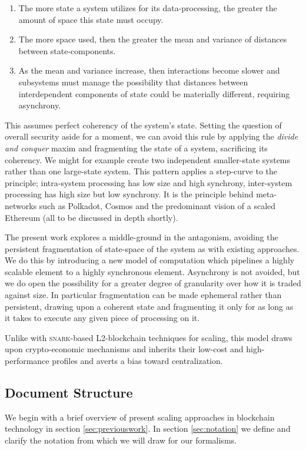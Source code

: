 \begin{enumerate}
  \item The more state a system utilizes for its data-processing, the greater the amount of space this state must occupy.
  \item The more space used, then the greater the mean and variance of distances between state-components.
  \item As the mean and variance increase, then interactions become slower and subsystems must manage the possibility that distances between interdependent components of state could be materially different, requiring asynchrony.
\end{enumerate}

This assumes perfect coherency of the system's state. Setting the question of overall security aside for a moment, we can avoid this rule by applying the \emph{divide and conquer} maxim and fragmenting the state of a system, sacrificing its coherency. We might for example create two independent smaller-state systems rather than one large-state system. This pattern applies a step-curve to the principle; intra-system processing has low size and high synchrony, inter-system processing has high size but low synchrony. It is the principle behind meta-networks such as Polkadot, Cosmos and the predominant vision of a scaled Ethereum (all to be discussed in depth shortly).

The present work explores a middle-ground in the antagonism, avoiding the persistent fragmentation of state-space of the system as with existing approaches. We do this by introducing a new model of computation which pipelines a highly scalable element to a highly synchronous element. Asynchrony is not avoided, but we do open the possibility for a greater degree of granularity over how it is traded against size. In particular fragmentation can be made ephemeral rather than persistent, drawing upon a coherent state and fragmenting it only for as long as it takes to execute any given piece of processing on it.

Unlike with \textsc{snark}-based L2-blockchain techniques for scaling, this model draws upon crypto-economic mechanisms and inherits their low-cost and high-performance profiles and averts a bias toward centralization.

\subsection{Document Structure}

We begin with a brief overview of present scaling approaches in blockchain technology in section \ref{sec:previouswork}. In section \ref{sec:notation} we define and clarify the notation from which we will draw for our formalisms.

